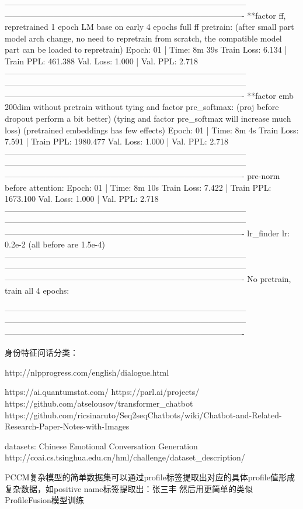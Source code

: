 \documentclass[letterpaper]{article} %
\begin{document}
\begin{CJK*}{UTF8}{gbsn}
-----------------------------------------------------------------------------------------
----------------------------------------------------------------------------------------
**factor ff, repretrained 1 epoch LM base on early 4 epochs full ff pretrain:
(after small part model arch change, no need to repretrain from scratch,
the compatible model part can be loaded to repretrain)
Epoch: 01 | Time: 8m 39s
	Train Loss: 6.134 | Train PPL: 461.388
	 Val. Loss: 1.000 |  Val. PPL:   2.718
-----------------------------------------------------------------------------------------
-----------------------------------------------------------------------------------------
----------------------------------------------------------------------------------------
**factor emb 200dim without pretrain without tying and factor pre_softmax:
(proj before dropout perform a bit better)
(tying and factor pre_softmax will increase much loss)
(pretrained embeddings has few effects)
Epoch: 01 | Time: 8m 4s
	Train Loss: 7.591 | Train PPL: 1980.477
	 Val. Loss: 1.000 |  Val. PPL:   2.718
-----------------------------------------------------------------------------------------
-----------------------------------------------------------------------------------------
----------------------------------------------------------------------------------------
pre-norm before attention:
Epoch: 01 | Time: 8m 10s
	Train Loss: 7.422 | Train PPL: 1673.100
	 Val. Loss: 1.000 |  Val. PPL:   2.718
-----------------------------------------------------------------------------------------
-----------------------------------------------------------------------------------------
----------------------------------------------------------------------------------------
lr_finder lr: 0.2e-2 (all before are 1.5e-4)
-----------------------------------------------------------------------------------------
-----------------------------------------------------------------------------------------
----------------------------------------------------------------------------------------
No pretrain, train all 4 epochs:

-----------------------------------------------------------------------------------------
-----------------------------------------------------------------------------------------
----------------------------------------------------------------------------------------



身份特征问话分类：


http://nlpprogress.com/english/dialogue.html

https://ai.quantumstat.com/
https://parl.ai/projects/
https://github.com/atselousov/transformer\_chatbot
https://github.com/ricsinaruto/Seq2seqChatbots/wiki/Chatbot-and-Related-Research-Paper-Notes-with-Images


datasets:
Chinese Emotional Conversation Generation
http://coai.cs.tsinghua.edu.cn/hml/challenge/dataset\_description/


PCCM复杂模型的简单数据集可以通过profile标签提取出对应的具体profile值形成复杂数据，如positive name标签提取出：张三丰
然后用更简单的类似ProfileFusion模型训练

\clearpage\end{CJK*}
\end{document}
